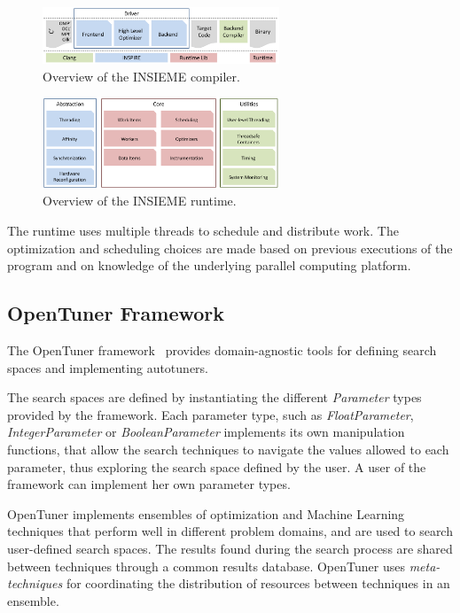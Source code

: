 \documentclass[a4paper, 12pt]{article}
\begin{document}
\begin{figure}[H]
    \centering
    \includegraphics[width=0.63\textwidth]{architecture_compiler}
    \captionsetup{width=0.64\textwidth}
    \caption{Overview of the INSIEME compiler.}
    \label{fig:insiemearch}
\end{figure}

\begin{figure}[H]
    \centering
    \includegraphics[width=0.63\textwidth]{architecture_runtime}
    \captionsetup{width=0.64\textwidth}
    \caption{Overview of the INSIEME runtime.}
    \label{fig:insiemerun}
\end{figure}

The runtime uses multiple threads to schedule and distribute work. The
optimization and scheduling choices are made based on previous executions
of the program and on knowledge of the underlying parallel computing
platform.

\subsection{OpenTuner Framework} \label{sec:opentuner}

The OpenTuner framework~\cite{ansel2014opentuner} provides domain-agnostic
tools for defining search spaces and implementing autotuners.

The search spaces are defined by instantiating the different 
\emph{Parameter} types provided by the framework. Each parameter
type, such as \emph{FloatParameter}, \emph{IntegerParameter} or
\emph{BooleanParameter} implements its own manipulation functions,
that allow the search techniques to navigate the values allowed
to each parameter, thus exploring the search space defined by the
user. A user of the framework can implement her own
parameter types.

OpenTuner implements ensembles of optimization and Machine 
Learning techniques that perform well in different problem domains,
and are used to search user-defined search spaces. The results found
during the search process are shared between techniques through a
common results database.
OpenTuner uses \emph{meta-techniques} for coordinating the
distribution of resources between techniques in an ensemble.
\end{document}
